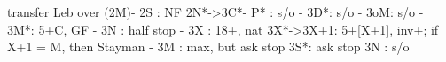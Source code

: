 transfer Leb over (2M)-
2S : NF
2N*->3C*- P* : s/o
        - 3D*: s/o
        - 3oM: s/o
        - 3M*: 5+C, GF
        - 3N : half stop
   - 3X : 18+, nat
3X*->3X+1: 5+[X+1], inv+; if X+1 = M, then Stayman
         - 3M : max, but ask stop
3S*: ask stop
3N : s/o